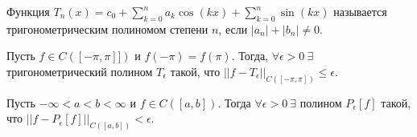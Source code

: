 \begin{definition}
    Функция $T_n(x) = c_0 + \sum\limits_{k = 0}^{n} a_k \cos(kx) + \sum\limits_{k = 0}^{n} \sin (kx)$ называется тригонометрическим полиномом степени $n$, если $|a_n| + |b_n| \neq 0$.
\end{definition}

\begin{corollary}
    Пусть $f \in C([-\pi, \pi]])$ и $f(-\pi) = f(\pi)$. Тогда, $\forall \epsilon > 0 \ \exists$ тригонометрический полином $T_{\epsilon}$ такой, что $||f - T_{\epsilon}||_{C([-\pi, \pi])} \le \epsilon$.
\end{corollary}

\begin{corollary}
    Пусть $-\infty < a < b < \infty$ и $f \in C([a, b])$. Тогда $\forall \epsilon > 0 \ \exists$ полином $P_{\epsilon}[f]$ такой, что $||f - P_{\epsilon}[f]||_{C([a, b])} < \epsilon$.  
\end{corollary}
